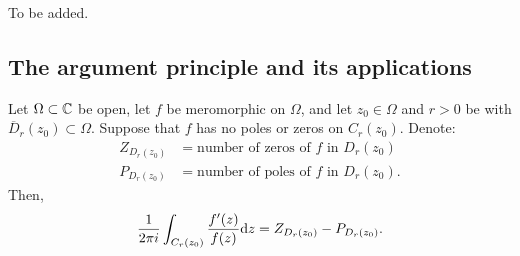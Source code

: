 \documentclass[11pt,a4paper]{article}
\begin{document}
\begin{example}
  To be added.
\end{example}

\subsection{The argument principle and its applications}

\begin{theorem}
  Let $\Omega \subset \mathbb{C}$ be open,
  let $f$ be meromorphic on $\Omega$,
  and let $z_0 \in \Omega$ and $r > 0$ be with $\overline D_r(z_0) \subset \Omega$.
  Suppose that $f$ has no poles or zeros on $C_r(z_0)$.
  Denote:
  \begin{align*}
    Z_{D_r(z_0)} &= \text{number of zeros of $f$ in $D_r(z_0)$} \\
    P_{D_r(z_0)} &= \text{number of poles of $f$ in $D_r(z_0)$}.
  \end{align*}
  Then,
  \[
    \frac{1}{2 \pi i} \int_{C_r(z_0)} \frac{f'(z)}{f(z)} \mathrm{d} z =
    Z_{D_r(z_0)} - P_{D_r(z_0)}.
  \]
\end{theorem}
\end{document}
